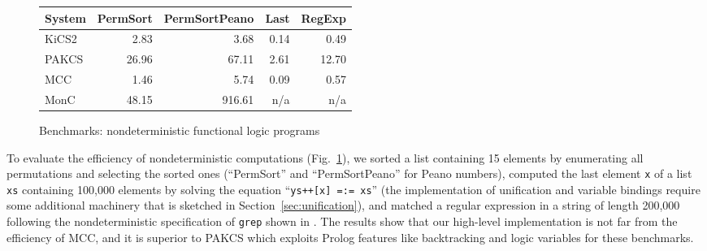 \documentclass{llncs}
\newcommand{\code}[1]{\mbox{\small\texttt{#1}}}
\newcommand{\ccode}[1]{``\code{#1}''}
\begin{document}
\begin{figure}
\centering
\begin{tabular}{|@{~~}l@{~~}|*{4}{@{~~}r@{~~}|}}
\hline
System  & PermSort & PermSortPeano &  Last & RegExp \\\hline
KiCS2   &    2.83  &        3.68   &  0.14 &   0.49 \\
PAKCS   &   26.96  &       67.11   &  2.61 &  12.70 \\
MCC     &    1.46  &        5.74   &  0.09 &   0.57 \\
MonC    &   48.15  &      916.61   &   n/a &    n/a \\
\hline
\end{tabular}
\caption{Benchmarks: nondeterministic functional logic programs}
 \label{fig:bench-nondet}
\end{figure}
%
To evaluate the efficiency of nondeterministic computations
(Fig.~\ref{fig:bench-nondet}),
we sorted a list containing 15 elements by enumerating all permutations
and selecting the sorted ones (``PermSort'' and ``PermSortPeano''
for Peano numbers),
computed the last element \code{x}
of a list \code{xs} containing 100,000 elements
by solving the equation \ccode{ys++[x] =:= xs}
(the implementation of unification and variable bindings
require some additional machinery that is sketched in
Section~\ref{sec:unification}),
and matched a regular expression in a string of length 200,000
following the nondeterministic specification of \code{grep} shown
in \cite{AntoyHanus10CACM}.
The results show that our high-level implementation is not far
from the efficiency of MCC,
and it is superior to PAKCS which exploits Prolog features
like backtracking and logic variables for these benchmarks.
\end{document}
